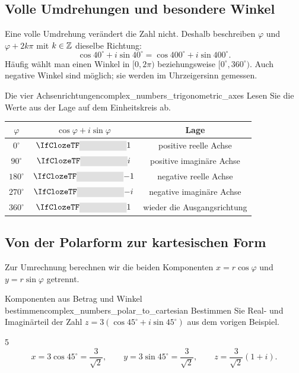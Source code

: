 \subsection{Volle Umdrehungen und besondere Winkel}
Eine volle Umdrehung verändert die Zahl nicht. Deshalb beschreiben
$\varphi$ und $\varphi+2k\pi$ mit $k\in\mathbb{Z}$ dieselbe Richtung:
\[
  \cos40^\circ+i\sin40^\circ
  =\cos400^\circ+i\sin400^\circ.
\]
Häufig wählt man einen Winkel in $[0,2\pi)$ beziehungsweise $[0^\circ,360^\circ)$.
Auch negative Winkel sind möglich; sie werden im Uhrzeigersinn gemessen.
\begin{ExampleBox}{Die vier Achsenrichtungen}{complex_numbers_trigonometric_axes}
  Lesen Sie die Werte aus der Lage auf dem Einheitskreis ab.
  \begin{center}
    \renewcommand{\arraystretch}{1.5}
    \begin{tabular}{@{}c@{\qquad}c@{\qquad}c@{}}
      $\varphi$ & $\cos\varphi+i\sin\varphi$ & Lage\\\midrule
      $0^\circ$ & $\Cloze{2cm}{1}$ & positive reelle Achse\\
      $90^\circ$ & $\Cloze{2cm}{i}$ & positive imaginäre Achse\\
      $180^\circ$ & $\Cloze{2cm}{-1}$ & negative reelle Achse\\
      $270^\circ$ & $\Cloze{2cm}{-i}$ & negative imaginäre Achse\\
      $360^\circ$ & $\Cloze{2cm}{1}$ & wieder die Ausgangsrichtung
    \end{tabular}
  \end{center}
\end{ExampleBox}

\subsection{Von der Polarform zur kartesischen Form}
Zur Umrechnung berechnen wir die beiden Komponenten $x=r\cos\varphi$
und $y=r\sin\varphi$ getrennt.
\begin{ExampleBox}{Komponenten aus Betrag und Winkel bestimmen}{complex_numbers_polar_to_cartesian}
  Bestimmen Sie Real- und Imaginärteil der Zahl
  $z=3(\cos45^\circ+i\sin45^\circ)$ aus dem vorigen Beispiel.
  \begin{ClozeArea}{5}
    \[
      x=3\cos45^\circ=\frac3{\sqrt2},\qquad
      y=3\sin45^\circ=\frac3{\sqrt2},\qquad
      z=\frac3{\sqrt2}(1+i).
    \]
  \end{ClozeArea}
\end{ExampleBox}


